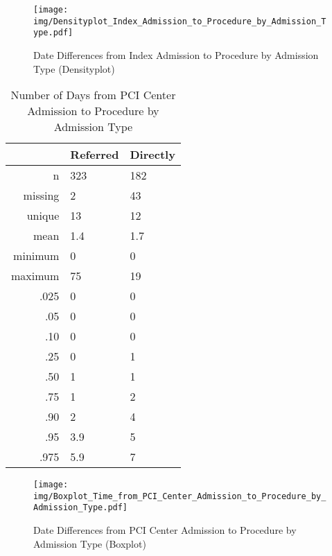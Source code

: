 \documentclass[presentation,xcolor=pdftex,dvipsnames,table,11pt]{beamer}
\begin{document}
\begin{tiny}
\begin{frame}
\begin{figure}
  \centering
  \caption{Date Differences from Index Admission to Procedure by Admission Type (Densityplot)}
  \label{Density: Date Differences from Index Admission to Procedure by Admission Type}
\texttt{[image: img/Densityplot\_Index\_Admission\_to\_Procedure\_by\_Admission\_Type.pdf]}\end{figure}
\end{frame}





\begin{table}[ht]
\centering
\begin{tabular}{rll}
  \toprule
 & Referred & Directly \\ 
  \midrule
n & 323 & 182 \\ 
  missing & 2 & 43 \\ 
  unique & 13 & 12 \\ 
  mean & 1.4 & 1.7 \\ 
  minimum & 0 & 0 \\ 
  maximum & 75 & 19 \\ 
  .025 & 0 & 0 \\ 
  .05 & 0 & 0 \\ 
  .10 & 0 & 0 \\ 
  .25 & 0 & 1 \\ 
  .50 & 1 & 1 \\ 
  .75 & 1 & 2 \\ 
  .90 & 2 & 4 \\ 
  .95 & 3.9 & 5 \\ 
  .975 & 5.9 & 7 \\ 
   \bottomrule
\end{tabular}
\caption{Number of Days from PCI Center Admission to Procedure by Admission Type} 
\end{table}
\begin{frame}
\begin{figure}
  \centering
  \caption{Date Differences from PCI Center Admission to Procedure by Admission Type (Boxplot)}
  \label{Boxplot: Date Differences from PCI Center Admission to Procedure by Admission Type}
\texttt{[image: img/Boxplot\_Time\_from\_PCI\_Center\_Admission\_to\_Procedure\_by\_Admission\_Type.pdf]}\end{figure}
\end{frame}



\end{tiny}
\end{document}
